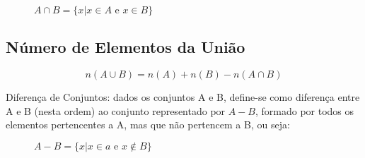 \begin{figure}[h]
\centering


\caption{$A\cap B=\{x|x\in A\mbox{ e }x\in B\}$}
\label{fig:my_label}
\end{figure}

\subsection{Número de Elementos da União}

$$n(A \cup B)=n(A)+n(B)-n(A\cap B)$$

\begin{defi}
Diferença de Conjuntos: dados os conjuntos A e B, define-se como diferença entre A e B (nesta ordem) ao conjunto representado por $A-B$, formado por todos os elementos pertencentes a A, mas que não pertencem a B, ou seja: 
\end{defi}

\begin{figure}[h]
\centering


\caption{$A-B=\{x|x\in a\mbox{ e }x\not\in B\}$}
\label{fig:my_label}
\end{figure}

